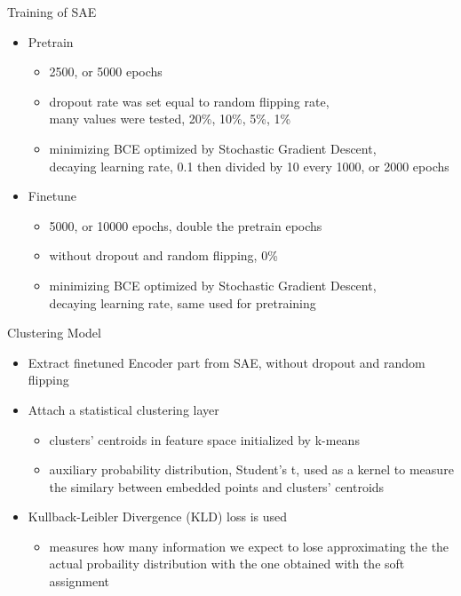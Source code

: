 \documentclass{beamer}
\begin{document}
\begin{frame}{Training of SAE}
	\begin{itemize}
		\item Pretrain
		\begin{itemize}
			\item 2500, or 5000 epochs
			\item dropout rate was set equal to random flipping rate,\\
				many values were tested, 20\%, 10\%, 5\%, 1\% 
			\item minimizing BCE optimized by Stochastic Gradient Descent,\\
				decaying learning rate, 0.1 then divided by 10 every 1000, or 2000 epochs
		\end{itemize}
		\item Finetune
		\begin{itemize}
			\item 5000, or 10000 epochs, double the pretrain epochs
			\item without dropout and random flipping, 0\%
			\item minimizing BCE optimized by Stochastic Gradient Descent,\\
				decaying learning rate, same used for pretraining
		\end{itemize}
	\end{itemize}
\end{frame}

\begin{frame}{Clustering Model}
	\begin{itemize}
		\item Extract finetuned Encoder part from SAE, without dropout and random flipping
		\item Attach a statistical clustering layer
		\begin{itemize}
			\item clusters' centroids in feature space initialized by k-means
			\item auxiliary probability distribution, Student's t, used as a kernel
				to measure the similary between embedded points and clusters' centroids
		\end{itemize}
		\item Kullback-Leibler Divergence (KLD) loss is used
		\begin{itemize}
			\item measures how many information we expect to lose approximating the
				the actual probaility distribution with the one obtained with the soft assignment
		\end{itemize}
	\end{itemize}
\end{frame}
\end{document}
